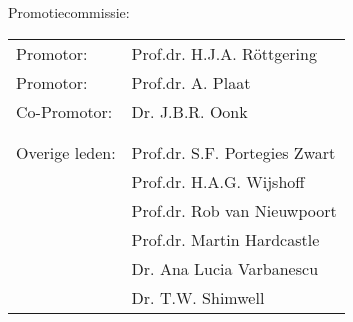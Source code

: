 

Promotiecommissie:



\begin{tabular}{ll}
Promotor: &Prof.dr. H.J.A. R{\"o}ttgering \\

Promotor: &Prof.dr. A. Plaat \\

Co-Promotor: &Dr. J.B.R. Oonk \\

\\

\\

Overige leden: &Prof.dr. S.F. Portegies Zwart\\

    &Prof.dr. H.A.G. Wijshoff \\
    
    &Prof.dr. Rob van Nieuwpoort \\
    
    &Prof.dr. Martin Hardcastle \\
    
    &Dr. Ana Lucia Varbanescu \\
    
    &Dr. T.W. Shimwell \\

\end{tabular}
